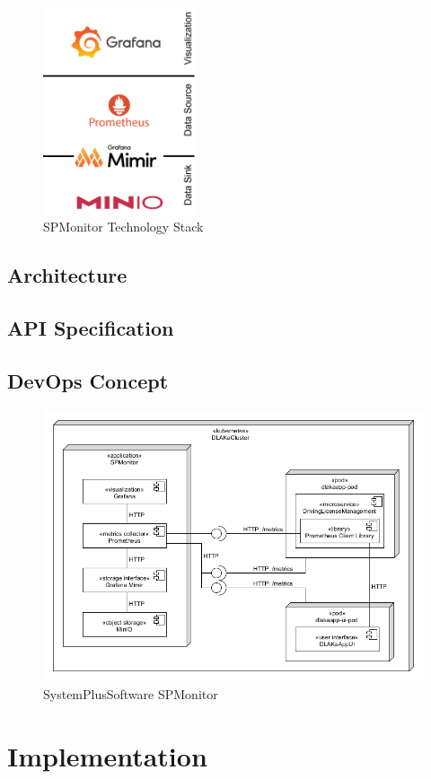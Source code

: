 \begin{figure}
	\centering
	\includegraphics[width=0.4\textwidth]{figures/spmonitor_tech_stack.png}
	\caption{SPMonitor Technology Stack}
	\label{fig:spmonitor_tech_stack}
\end{figure}

\subsection{Architecture}


\subsection{API Specification}

\subsection{DevOps Concept}

\begin{figure}[h]
	\centering
	\includegraphics[width=\textwidth]{figures/sps_spmonitor.png}
	\caption{SystemPlusSoftware SPMonitor}
	\label{fig:sps_spmonitor}
\end{figure}

\section{Implementation}